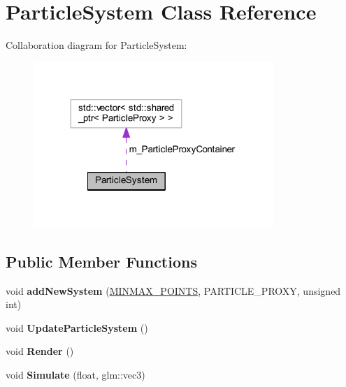 \hypertarget{class_particle_system}{}\section{Particle\+System Class Reference}
\label{class_particle_system}


Collaboration diagram for Particle\+System\+:
\nopagebreak
\begin{figure}[H]
\begin{center}
\leavevmode
\includegraphics[width=257pt]{class_particle_system__coll__graph}
\end{center}
\end{figure}
\subsection*{Public Member Functions}
\begin{DoxyCompactItemize}
\item 
void {\bfseries add\+New\+System} (\hyperlink{struct_m_i_n_m_a_x___p_o_i_n_t_s}{M\+I\+N\+M\+A\+X\+\_\+\+P\+O\+I\+N\+TS}, P\+A\+R\+T\+I\+C\+L\+E\+\_\+\+P\+R\+O\+XY, unsigned int)\hypertarget{class_particle_system_ab0db87835a2e7e25e6defe6db5e64cac}{}\label{class_particle_system_ab0db87835a2e7e25e6defe6db5e64cac}

\item 
void {\bfseries Update\+Particle\+System} ()\hypertarget{class_particle_system_ae5831b13cc8807f5d1f15ec7e417129b}{}\label{class_particle_system_ae5831b13cc8807f5d1f15ec7e417129b}

\item 
void {\bfseries Render} ()\hypertarget{class_particle_system_a71b91106260fc592e7affe0479b7dce4}{}\label{class_particle_system_a71b91106260fc592e7affe0479b7dce4}

\item 
void {\bfseries Simulate} (float, glm\+::vec3)\hypertarget{class_particle_system_aa12fb82aab4de6740518775ae32a9929}{}\label{class_particle_system_aa12fb82aab4de6740518775ae32a9929}

\end{DoxyCompactItemize}

